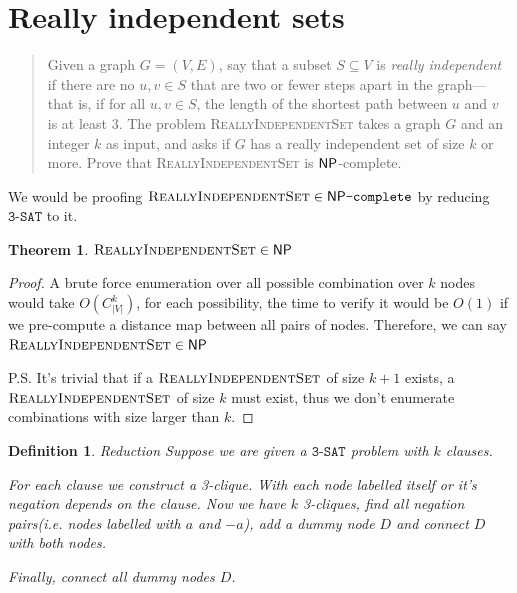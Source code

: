 
\newtheorem{theorem}{Theorem}
\newtheorem{lemma}[theorem]{Lemma}
\newtheorem{definition}{Definition}[section]


\maketitle
\thispagestyle{firststyle}
\vspace{-2.0cm}

\newcommand{\RIS}{\textsc{ReallyIndependentSet}}
\newcommand{\NPC}{\mathsf{NP}\texttt{-complete}}
\newcommand{\tSAT}{\texttt{3-SAT}}

\section{Really independent sets}
    \begin{quote}
    Given a graph $G = (V,E)$, say that a subset $S \subseteq V$ is \emph{really independent} if there are no $u,v \in S$ that are two or fewer steps apart in the graph---that is, if for all $u,v \in S$, the length of the shortest path
    between $u$ and $v$ is at least 3.
    The problem \textsc{ReallyIndependentSet} takes a graph $G$ and an integer $k$ as input, and asks if $G$ has a really independent set of size $k$ or more.
    Prove that \textsc{ReallyIndependentSet} is $\mathsf{NP}$-complete.
    \end{quote}

We would be proofing $\RIS \in \NPC$ by reducing $\tSAT$ to it. 

\begin{theorem}
    $\RIS \in \NP $
\end{theorem}

\begin{proof}
    A brute force enumeration over all possible combination over $k$ nodes would take $O(C^k_{|V|})$, for each possibility, the time to verify it would be $O(1)$ if we pre-compute a distance map between all pairs of nodes.
    Therefore, we can say $\RIS \in \NP$
    
    P.S. It's trivial that if a $\RIS$ of size $k+1$ exists, a $\RIS$ of size $k$ must exist, thus we don't enumerate combinations with size larger than $k$.
\end{proof}

\begin{definition}{Reduction}
    Suppose we are given a $\tSAT$ problem with $k$ clauses.

    For each clause we construct a 3-clique. With each node labelled itself or it's negation depends on the clause.
    Now we have $k$ 3-cliques, find all negation pairs(i.e. nodes labelled with $a$ and $-a$), add a dummy node $D$ and connect $D$ with both nodes.

    Finally, connect all dummy nodes $D$.
\end{definition}

